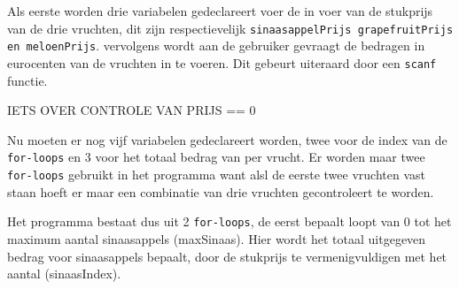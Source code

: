 Als eerste worden drie variabelen gedeclareert voer de in voer van de stukprijs van de drie vruchten, dit zijn respectievelijk {\tt sinaasappelPrijs grapefruitPrijs en meloenPrijs}.
vervolgens wordt aan de gebruiker gevraagt de bedragen in eurocenten van de vruchten  in te voeren.
Dit gebeurt uiteraard door een {\tt scanf} functie.

IETS OVER CONTROLE VAN PRIJS == 0

Nu moeten er nog vijf variabelen gedeclareert worden, twee voor de index van de {\tt for-loops} en 3 voor het totaal bedrag van per vrucht.
Er worden maar twee {\tt for-loops} gebruikt in het programma want alsl de eerste twee vruchten vast staan hoeft er maar een combinatie van drie vruchten gecontroleert te worden.
  
Het programma bestaat dus uit 2 {\tt for-loops}, de eerst  bepaalt loopt van 0 tot het maximum aantal sinaasappels (maxSinaas).
Hier wordt het totaal uitgegeven bedrag voor sinaasappels bepaalt, door de stukprijs te vermenigvuldigen met het aantal (sinaasIndex).
